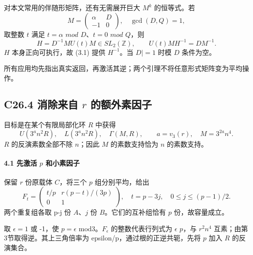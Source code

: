 \documentclass[11pt,a4paper]{article}
\theoremstyle{definition}
\numberwithin{equation}{section}
\begin{document}
{对本文常用的伴随形矩阵，还有无需展开巨大} {\ensuremath{M^{k}}} {的恒等式。若} \[
M=\begin{pmatrix}\alpha&D\\-1&0\end{pmatrix},
\quad \gcd(D,Q)=1,
\] {取整数} {\ensuremath{t}} {满足} {\ensuremath{t=\alpha }} {\ensuremath{mod}} {\ensuremath{D}、\ensuremath{t=0}} {\ensuremath{mod}} {\ensuremath{Q}，则} \[
H=D^{-1}MU(t)M\in SL_2(\mathbb Z),\qquad
U(t)MH^{-1}=DM^{-1}.
\tag{C26.3.2}
\] {\ensuremath{H}} {本身正向可执行，故} {(3.1)} {提供} {\ensuremath{H^{-1}}。当} {\textbar{}\ensuremath{D|=1}} {时模} {\ensuremath{D}} {条件为空。}

{所有应用均先指出真实返回，再激活其逆；两个引理不将任意形式矩阵变为平均操作。}

\subsection*{\texorpdfstring{{C26.4} {消除来自} {\ensuremath{r}} {的额外素因子}}{C26.4 消除来自  的额外素因子}}\label{C26-h160}

{目标是在某个有限局部化环} {\ensuremath{R}} {中获得} \[
U(3^a n^2R),\quad L(3^a n^2R),\quad
\Gamma(M,R),\qquad
a=v_3(r),\quad M=3^{2a}n^4.
\tag{C26.4.1}
\] {\ensuremath{R}} {的反演素数全部不除} {\ensuremath{n}；因此} {\ensuremath{M}} {的素数支持恰为} {\ensuremath{n}} {的素数支持。}

\paragraph*{\texorpdfstring{{4.1} {先激活} {\ensuremath{p}} {和小素因子}}{4.1 先激活  和小素因子}}\label{C26-h161}

{保留} {\ensuremath{r}} {份原载体} {\ensuremath{C}，将三个} {\ensuremath{p}} {组分别平均，给出} \[
F_t=\begin{pmatrix}t/p&r(p-t)/(3p)\\0&1\end{pmatrix},
\quad t=p-3j,\quad0\le j\le(p-1)/2.
\tag{C26.4.2}
\] {两个重复组各取} {p-j} {份} {\ensuremath{A}、\ensuremath{j}} {份} {\ensuremath{B}。它们的互补组恰有} {\ensuremath{p}} {份，故容量成立。}

{取} {\ensuremath{\epsilon =1}} {或} {-1，使} {\ensuremath{p=\epsilon }} {mod3。\ensuremath{F_\epsilon }} {的整数代表行列式为} {\ensuremath{\epsilon }} {\ensuremath{p}，与} {\ensuremath{r^{2}n^{4}}} {互素；由第3节取得逆。其上三角倍率为} {epsilon/p，通过根的正逆共轭，先将} {\ensuremath{p}} {加入} {\ensuremath{R}} {的反演集合。}
\end{document}

